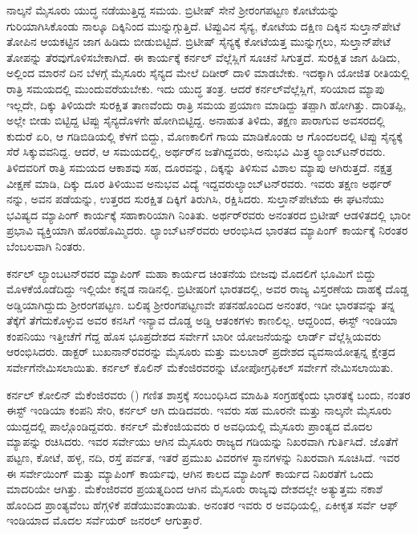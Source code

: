 ನಾಲ್ಕನೆ ಮೈಸೂರು ಯುದ್ಧ ನಡೆಯುತ್ತಿದ್ದ ಸಮಯ. ಬ್ರಿಟೀಷ್​ ಸೇನೆ ಶ‍್ರೀರಂಗಪಟ್ಟಣ ಕೋಟೆಯನ್ನು ಗುರಿಯಾಗಿಸಿಕೊಂಡು ನಾಲ್ಕೂ ದಿಕ್ಕಿನಿಂದ ಮುನ್ನುಗ್ಗುತ್ತಿದೆ. ಟಿಪ್ಪುವಿನ ಸೈನ್ಯ, ಕೋಟೆಯ ದಕ್ಷಿಣ ದಿಕ್ಕಿನ ಸುಲ್ತಾನ್​ಪೇಟೆ ತೋಪಿನ ಆಯಕಟ್ಟಿನ ಜಾಗ ಹಿಡಿದು ಬೀಡುಬಿಟ್ಟಿದೆ. ಬ್ರಿಟೀಷ್​ ಸೈನ್ಯಕ್ಕೆ ಕೋಟೆಯತ್ತ ಮುನ್ನುಗ್ಗಲು, ಸುಲ್ತಾನ್​ಪೇಟೆ ತೋಪನ್ನು ತೆರವುಗೊಳಿಸಬೇಕಾಗಿದೆ. ಈ ಕಾರ್ಯಕ್ಕೆ ಕರ್ನಲ್​ ವೆಲ್ಲೆಸ್ಲಿಗೆ ಸೂಚನೆ ಸಿಗುತ್ತದೆ. ಸುರಕ್ಷಿತ ಜಾಗ ಹಿಡಿದು, ಅಲ್ಲಿಂದ ಮಾರನೆ ದಿನ ಬೆಳಗ್ಗೆ ಮೈಸೂರು ಸೈನ್ಯದ ಮೇಲೆ ದಿಡೀರ್​ ದಾಳಿ ಮಾಡಬೇಕು. ಇದಕ್ಕಾಗಿ ಯೋಜಿತ ರೀತಿಯಲ್ಲಿ ರಾತ್ರಿ ಸಮಯದಲ್ಲಿ ಮುಂದುವರೆಯಬೇಕು. ಇದು ಯುದ್ಧ ತಂತ್ರ. ಆದರೆ ಕರ್ನಲ್​ ವೆಲ್ಲೆಸ್ಲಿಗೆ, ಸರಿಯಾದ ಮ್ಯಾಪು ಇಲ್ಲದೇ, ದಿಕ್ಕು ತಿಳಿಯದೇ ಸುರಕ್ಷಿತ ತಾಣವೆಂದು ರಾತ್ರಿ ಸಮಯ ಪ್ರಯಾಣ ಮಾಡಿದ್ದು ತಪ್ಪಾಗಿ ಹೋಗಿತ್ತು. ದಾರಿತಪ್ಪಿ, ಅಲ್ಲೇ ಬೀಡು ಬಿಟ್ಟಿದ್ದ ಟಿಪ್ಪು ಸೈನ್ಯದೊಳಗೇ ಹೋಗಿಬಿಟ್ಟಿದ್ದ. ಅನಾಹುತ ತಿಳಿದು, ತಕ್ಷಣ ಪಾರಾಗುವ ಅವಸರದಲ್ಲಿ ಕುದುರೆ ಏರಿ, ಆ ಗಡಿಬಿಡಿಯಲ್ಲಿ ಕೆಳಗೆ ಬಿದ್ದು, ಮೊಣಕಾಲಿಗೆ ಗಾಯ ಮಾಡಿಕೊಂಡು ಆ ಗೊಂದಲದಲ್ಲಿ ಟಿಪ್ಪು ಸೈನ್ಯಕ್ಕೆ ಸೆರೆ ಸಿಕ್ಕುವವನಿದ್ದ. ಆದರೆ, ಆ ಸಮಯದಲ್ಲಿ, ಅರ್ಥರ್​ನ ಜತೆಗಿದ್ದವರು, ಅನುಭವಿ ಮಿತ್ರ ಲ್ಯಾಂಬ್​ಟನ್​ರವರು. ತಿಳಿದವರಿಗೆ ರಾತ್ರಿ ಸಮಯದ ಆಕಾಶವು ಸಹ, ದೂರವನ್ನು, ದಿಕ್ಕನ್ನು ತಿಳಿಸುವ ವಿಶಾಲ ಮ್ಯಾಪು ಆಗಿರುತ್ತದೆ. ನಕ್ಷತ್ರ ವೀಕ್ಷಣೆ ಮಾಡಿ, ದಿಕ್ಕು ದೂರ ತಿಳಿಯುವ ಅನುಭವ ವಿದ್ಯೆ ಇದ್ದವರು\break ಲ್ಯಾಂಬ್​ಟನ್​ರವರು. ಇವರು ತಕ್ಷಣ ಅರ್ಥರ್​ನನ್ನು, ಅವನ ಪಡೆಯನ್ನು, ಉತ್ತರದ ಸುರಕ್ಷಿತ ದಿಕ್ಕಿಗೆ ತಿರುಗಿಸಿ, ರಕ್ಷಿಸಿದರು. ಸುಲ್ತಾನ್​ಪೇಟೆಯ ಈ ಘಟನೆಯು ಭವಿಷ್ಯದ ಮ್ಯಾಪಿಂಗ್​ ಕಾರ್ಯಕ್ಕೆ ಸಹಾಕಾರಿಯಾಗಿ ನಿಂತಿತು. ಅರ್ಥರ್​ರವರು ಅನಂತರದ ಬ್ರಿಟೀಷ್​ ಆಡಳಿತದಲ್ಲಿ ಭಾರೀ ಪ್ರಭಾವಿ ವ್ಯಕ್ತಿಯಾಗಿ ಹೊರಹೊಮ್ಮಿದರು. ಲ್ಯಾಂಬ್​ಟನ್​ರವರು ಆರಂಭಿಸಿದ ಭಾರತದ ಮ್ಯಾಪಿಂಗ್​ ಕಾರ್ಯಕ್ಕೆ ನಿರಂತರ ಬೆಂಬಲವಾಗಿ ನಿಂತರು.

ಕರ್ನಲ್​ ಲ್ಯಾಂಬಟನ್​ರವರ ಮ್ಯಾಪಿಂಗ್​ ಮಹಾ ಕಾರ್ಯದ ಚಿಂತನೆಯ ಬೀಜವು ಮೊದಲಿಗೆ ಭೂಮಿಗೆ ಬಿದ್ದು ಮೊಳಕೆಯೊಡೆದಿದ್ದು ಇಲ್ಲಿಯೇ ಕನ್ನಡ ನಾಡಿನಲ್ಲಿ. ಬ್ರಿಟೀಷರಿಗೆ ಭಾರತದಲ್ಲಿ, ಅವರ ರಾಜ್ಯ ವಿಸ್ತರಣೆಯ ದಾಹಕ್ಕೆ ದೊಡ್ಡ ಅಡ್ಡಿಯಾಗಿದ್ದುದು ಶ‍್ರೀರಂಗಪಟ್ಟಣ. ಬಲಿಷ್ಠ ಶ‍್ರೀರಂಗಪಟ್ಟಣವೇ ಪತನಹೊಂದಿದ ಅನಂತರ, ಇಡೀ ಭಾರತವನ್ನು ತನ್ನ ತೆಕ್ಕೆಗೆ ತೆಗೆದುಕೊಳ್ಳುವ ಅವರ ಕನಸಿಗೆ ಇನ್ಯಾವ ದೊಡ್ಡ ಅಡ್ಡಿ ಆತಂಕಗಳು ಕಾಣಲಿಲ್ಲ. ಆದ್ದರಿಂದ, ಈಸ್ಟ್​ ಇಂಡಿಯಾ ಕಂಪನಿಯು ಇತ್ತೀಚೆಗೆ ಗೆದ್ದ ಹೊಸ ಭೂಪ್ರದೇಶದ ಸರ್ವೇಗೆ ಬಾರೀ ಯೋಜನೆಯನ್ನು ಲಾರ್ಡ್ ವೆಲ್ಲೆಸ್ಲಿಯವರು ಆರಂಭಿಸಿದರು. ಡಾಕ್ಟರ್​ ಬುಖನಾನ್​ರವರನ್ನು ಮೈಸೂರು ಮತ್ತು ಮಲಬಾರ್​ ಪ್ರದೇಶದ ವ್ಯವಸಾಯೋತ್ಪನ್ನ ಕ್ಷೇತ್ರದ ಸರ್ವೇಗೆ\break ನೇಮಿಸಲಾಯಿತು. ಕರ್ನಲ್​ ಕೊಲಿನ್​ ಮೆಕೆಂಜಿರವರನ್ನು ಟೋಪೋಗ್ರಫಿಕಲ್​ ಸರ್ವೇಗೆ ನೇಮಿಸಲಾಯಿತು.

ಕರ್ನಲ್​ ಕೋಲಿನ್​ ಮೆಕೆಂಜಿರವರು () ಗಣಿತ ಶಾಸ್ರಕ್ಕೆ ಸಂಬಂಧಿಸಿದ ಮಾಹಿತಿ ಸಂಗ್ರಹಕ್ಕೆಂದು ಭಾರತಕ್ಕೆ ಬಂದು, ನಂತರ ಈಸ್ಟ್​ ಇಂಡಿಯಾ ಕಂಪನಿ ಸೇರಿ, ಕರ್ನಲ್​ ಆಗಿ ದುಡಿದವರು. ಇವರು ಸಹ ಮೂರನೇ ಮತ್ತು ನಾಲ್ಕನೇ ಮೈಸೂರು ಯುದ್ದದಲ್ಲಿ ಪಾಲ್ಗೊಂಡಿದ್ದವರು. ಕರ್ನಲ್​ ಮೆಕೆಂಜಿಯವರು ರ ಅವಧಿಯಲ್ಲಿ ಮೈಸೂರು ಪ್ರಾಂತ್ಯದ ಮೊದಲ ಮ್ಯಾಪನ್ನು ರಚಿಸಿದರು. ಇವರ ಸರ್ವೇಯು ಆಗಿನ ಮೈಸೂರು ರಾಜ್ಯದ ಗಡಿಯನ್ನು ನಿಖರವಾಗಿ ಗುರ್ತಿಸಿದೆ. ಜೊತೆಗೆ ಪಟ್ಟಣ, ಕೋಟೆ, ಹಳ್ಳ, ನದಿ, ರಸ್ತೆ ಪರ್ವತ, ಇತರೆ ಪ್ರಮುಖ ವಿವರಗಳ ಸ್ಥಾನಗಳನ್ನು ನಿಖರವಾಗಿ ಸೂಚಿಸಿದೆ. ಇವರ ಈ ಸರ್ವೇಯಿಂಗ್​ ಮತ್ತು ಮ್ಯಾಪಿಂಗ್​ ಕಾರ್ಯವು, ಆಗಿನ ಕಾಲದ ಮ್ಯಾಪಿಂಗ್​ ಕಾರ್ಯದ ನಿಖರತೆಗೆ ಒಂದು ಮಾದರಿಯೇ ಆಗಿತ್ತು. ಮೆಕೆಂಜಿರವರ ಪ್ರಯತ್ನದಿಂದ ಆಗಿನ ಮೈಸೂರು ರಾಜ್ಯವು ದೇಶದಲ್ಲೇ ಅತ್ಯುತ್ತಮ ನಕಾಶೆ ಹೊಂದಿದ ಪ್ರಾಂತ್ಯವೆಂಬ ಹೆಗ್ಗಳಿಕೆ ಪಡೆಯುವಂತಾಯಿತು. ಅನಂತರ ಇವರು ರ ಅವಧಿಯಲ್ಲಿ, ಏಕೀಕೃತ ಸರ್ವೆ ಆಫ್​ ಇಂಡಿಯಾದ ಮೊದಲ ಸರ್ವೆಯರ್​ ಜನರಲ್​ ಆಗುತ್ತಾರೆ.

